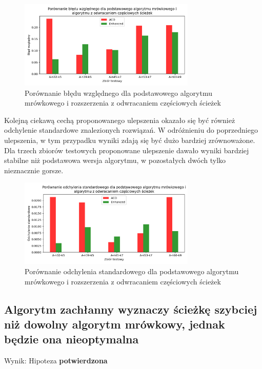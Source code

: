 \documentclass[10pt]{article}
\begin{document}
\begin{figure}[H]
    \centering
    \includegraphics[width=0.75\textwidth]{errors_enhanced.png}
    \caption{Porównanie błędu względnego dla podstawowego algorytmu mrówkowego i rozszerzenia z odwracaniem częściowych ścieżek}
    \label{fig:errors_enhanced}
\end{figure}

Kolejną ciekawą cechą proponowanego ulepszenia okazało się być również odchylenie standardowe znalezionych rozwiązań. W odróżnieniu do poprzedniego ulepszenia, w tym przypadku wyniki zdają się być dużo bardziej zrównoważone. Dla trzech zbiorów testowych proponowane ulepszenie dawało wyniki bardziej stabilne niż podstawowa wersja algorytmu, w pozostałych dwóch tylko nieznacznie gorsze.

\begin{figure}[H]
    \centering
    \includegraphics[width=0.75\textwidth]{deviation_enhanced.png}
    \caption{Porównanie odchylenia standardowego dla podstawowego algorytmu mrówkowego i rozszerzenia z odwracaniem częściowych ścieżek}
    \label{fig:deviation_enhanced}
\end{figure}

\subsection{Algorytm zachłanny wyznaczy ścieżkę szybciej niż dowolny algorytm mrówkowy, jednak będzie ona nieoptymalna}
Wynik: Hipoteza \textbf{potwierdzona}
\end{document}
